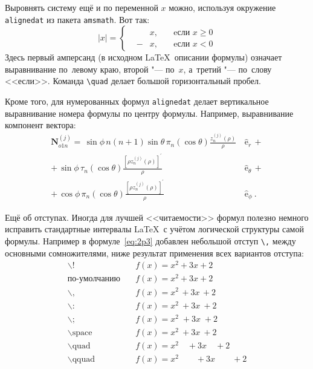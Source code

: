 Выровнять систему ещё и по переменной \( x \) можно, используя окружение
\verb|alignedat| из пакета \verb|amsmath|. Вот так:
\[
|x| = \left\{
\begin{alignedat}{2}
     &   & x, \quad & \text{eсли } x\geqslant 0 \\
     & - & x, \quad & \text{eсли } x<0
\end{alignedat}
\right.
\]
Здесь первый амперсанд (в исходном \LaTeX\ описании формулы) означает
выравнивание по~левому краю, второй "--- по~\( x \), а~третий "--- по~слову
<<если>>. Команда \verb|\quad| делает большой горизонтальный пробел.



Кроме того, для  нумерованных формул \verb|alignedat| делает вертикальное
выравнивание номера формулы по центру формулы. Например, выравнивание
компонент вектора:
\begin{equation}
    \label{eq:2p3}
    \begin{alignedat}{2}
        {\mathbf{N}}_{o1n}^{(j)} = \,{\sin} \phi\,n\!\left(n+1\right)
        {\sin}\theta\,
        \pi_n\!\left({\cos} \theta\right)
        \frac{
        z_n^{(j)}\!\left( \rho \right)
        }{\rho}\,
         & {\boldsymbol{\hat{\mathrm e}}}_{r}\,+      \\
        +\,
        {\sin} \phi\,
        \tau_n\!\left({\cos} \theta\right)
        \frac{
        \left[\rho z_n^{(j)}\!\left( \rho \right)\right]^{\prime}
        }{\rho}\,
         & {\boldsymbol{\hat{\mathrm e}}}_{\theta}\,+ \\
        +\,
        {\cos} \phi\,
        \pi_n\!\left({\cos} \theta\right)
        \frac{
        \left[\rho z_n^{(j)}\!\left( \rho \right)\right]^{\prime}
        }{\rho}\,
         & {\boldsymbol{\hat{\mathrm e}}}_{\phi}\:.
    \end{alignedat}
\end{equation}

Ещё об отступах. Иногда для лучшей <<читаемости>> формул полезно
немного исправить стандартные интервалы \LaTeX\ с учётом логической
структуры самой формулы. Например в формуле~\cref{eq:2p3} добавлен
небольшой отступ \verb+\,+ между основными сомножителями, ниже
результат применения всех вариантов отступа:
\begin{align*}
    \backslash!             & \quad f(x) = x^2\! +3x\! +2         \\
    \mbox{по-умолчанию}     & \quad f(x) = x^2+3x+2               \\
    \backslash,             & \quad f(x) = x^2\, +3x\, +2         \\
    \backslash{:}           & \quad f(x) = x^2\: +3x\: +2         \\
    \backslash;             & \quad f(x) = x^2\; +3x\; +2         \\
    \backslash \mbox{space} & \quad f(x) = x^2\ +3x\ +2           \\
    \backslash \mbox{quad}  & \quad f(x) = x^2\quad +3x\quad +2   \\
    \backslash \mbox{qquad} & \quad f(x) = x^2\qquad +3x\qquad +2
\end{align*}

